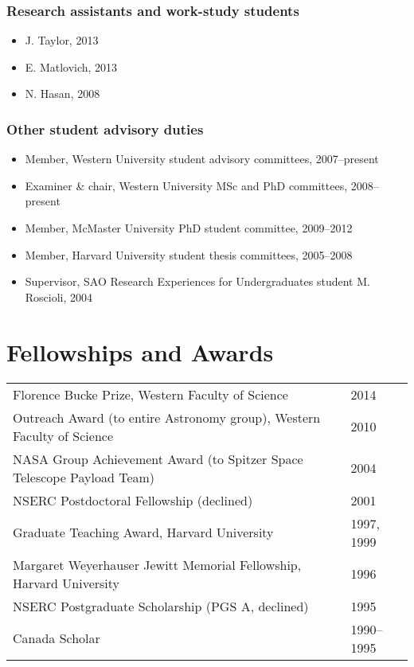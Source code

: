 \documentclass[12pt]{article}
\begin{document}
\subsubsection{Research assistants and work-study students}
\begin{itemize}
\item J. Taylor, 2013
\item E. Matlovich, 2013
\item N. Hasan, 2008
\end{itemize}

\subsubsection{Other student advisory duties}
\begin{itemize}
\item Member, Western University student advisory committees, 2007--present\\
\item Examiner \& chair, Western University MSc and PhD committees, 2008--present\\
\item Member, McMaster University PhD student committee, 2009--2012\\
\item Member, Harvard University student thesis committees, 2005--2008\\
\item Supervisor, SAO  Research Experiences for Undergraduates student M. Roscioli, 2004
\end{itemize}

\section{Fellowships and Awards}

\begin{tabular}{ll}
Florence Bucke Prize, Western Faculty of Science & 2014\\
Outreach Award (to entire Astronomy group), Western Faculty of Science & 2010 \\
NASA Group Achievement Award (to Spitzer Space Telescope Payload Team)& 2004\\
NSERC Postdoctoral Fellowship (declined)& 2001 \\
Graduate Teaching Award, Harvard University & 1997, 1999 \\
Margaret Weyerhauser Jewitt Memorial Fellowship, Harvard University & 1996\\
NSERC Postgraduate Scholarship (PGS A, declined) & 1995 \\
Canada Scholar &1990--1995\\
\end{tabular}
\end{document}
